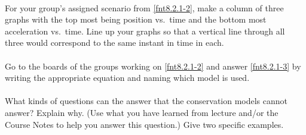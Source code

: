 \noindent{}\\
	
\noindent For your group's assigned scenario from \ref{fnt8.2.1-2}, make a column of three graphs with the top most being position vs.\ time and the bottom most acceleration vs.\ time. Line up your graphs so that a vertical line through all three would correspond to the same instant in time in each.\\
	
\noindent{}\\
	
\noindent Go to the boards of the groups working on \ref{fnt8.2.1-2} and answer \ref{fnt8.2.1-3} by writing the appropriate equation and naming which model is used.\\
	
\noindent{}\\
	
\noindent What kinds of questions can the \FModel{} answer that the conservation models cannot answer? Explain why. (Use what you have learned from lecture and/or the Course Notes to help you answer this question.) Give two specific examples.\\

\WCD
